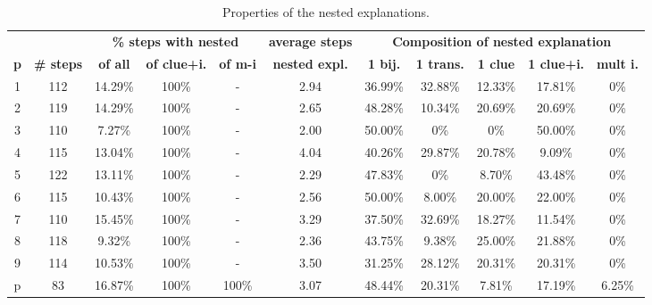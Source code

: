 \begin{table}[t]
	\centering
	\begin{tabular}{c|c|ccc|c|ccccc}
		& &  \multicolumn{3}{c|}{\textbf{\% steps with nested}} & \multicolumn{1}{c|}{\textbf{average steps}} & \multicolumn{5}{c}{\textbf{Composition of nested explanation }}\\
		\textbf{p} & \textbf{\# steps } & \textbf{of all}     & \textbf{of clue+i.} & \textbf{of m-i}          & \textbf{nested expl.} & \textbf{1 bij.} & \textbf{1 trans.} & \textbf{1 clue} & \textbf{1 clue+i.} & \textbf{mult i.} \\ \hline
		1 &      112 &  14.29\% &  100\% &  - &         2.94 &  36.99\% &   32.88\% &  12.33\% &    17.81\% &    0\% \\
		2 &      119 &  14.29\% &  100\% &  - &         2.65 &  48.28\% &   10.34\% &  20.69\% &    20.69\% &    0\% \\
		3 &      110 &   7.27\% &  100\% &  - &         2.00 &  50.00\% &    0\% &   0\% &    50.00\% &    0\% \\
		4 &      115 &  13.04\% &  100\% &  - &         4.04 &  40.26\% &   29.87\% &  20.78\% &     9.09\% &    0\% \\
		5 &      122 &  13.11\% &  100\% &  - &         2.29 &  47.83\% &    0\% &   8.70\% &    43.48\% &    0\% \\
		6 &      115 &  10.43\% &  100\% &  - &         2.56 &  50.00\% &    8.00\% &  20.00\% &    22.00\% &    0\% \\
		7 &      110 &  15.45\% &  100\% &  - &         3.29 &  37.50\% &   32.69\% &  18.27\% &    11.54\% &    0\% \\
		8 &      118 &   9.32\% &  100\% &  - &         2.36 &  43.75\% &    9.38\% &  25.00\% &    21.88\% &    0\% \\
		9 &      114 &  10.53\% &  100\% &  - &         3.50 &  31.25\% &   28.12\% &  20.31\% &    20.31\% &    0\% \\
		p &       83 &  16.87\% &  100\% &  100\% &         3.07 &  48.44\% &   20.31\% &   7.81\% &    17.19\% &    6.25\% \\
	\end{tabular}
	\caption{Properties of the nested explanations. 
	}
	\label{table:nested_explanation}
\end{table}

